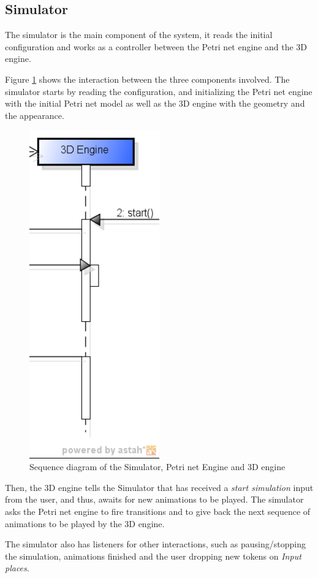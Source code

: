 \subsection{Simulator}

The simulator is the main component of the system, it reads the initial configuration and works as a controller between the Petri net engine and the 3D engine.

Figure \ref{fig:sd-engines} shows the interaction between the three components involved. The simulator starts by reading the configuration, and initializing the Petri net engine with the initial Petri net model as well as the 3D engine with the geometry and the appearance. 

\begin{figure}[htp]
\begin{center}
  \includegraphics[width=0.5\textwidth]{image/sd-engines.png}
  \caption{Sequence diagram of the Simulator, Petri net Engine and 3D engine}
  \label{fig:sd-engines}
\end{center}
\end{figure}

Then, the 3D engine tells the Simulator that has received a \textit{start simulation} input from the user, and thus, awaits for new animations to be played. The simulator asks the Petri net engine to fire transitions and to give back the next sequence of animations to be played by the 3D engine.

The simulator also has listeners for other interactions, such as pausing/stopping the simulation, animations finished and the user dropping new tokens on \textit{Input places}.